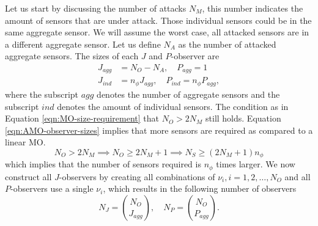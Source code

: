 Let us start by discussing the number of attacks $N_M$, this number indicates the amount of sensors that are under attack. Those individual sensors could be in the same aggregate sensor. We will assume the worst case, all attacked sensors are in a different aggregate sensor. Let us define $N_A$ as the number of attacked aggregate sensors. The sizes of each $J$ and $P$-observer are
\begin{equation}\label{eqn:AMO-observer-sizes}
    \begin{split}
        J_{agg}&=N_O-N_A, \quad P_{agg}=1 \\
        J_{ind} &= n_{\phi}J_{agg}, \quad P_{ind} = n_{\phi}P_{agg},
    \end{split}
\end{equation}
where the subscript $agg$ denotes the number of aggregate sensors and the subscript $ind$ denotes the amount of individual sensors. The condition as in Equation \eqref{eqn:MO-size-requirement} that $N_O>2N_M$ still holds. Equation \eqref{eqn:AMO-observer-sizes} implies that more sensors are required as compared to a linear MO. 
\begin{equation*}
    N_O > 2N_M \implies N_O \geq 2N_M + 1 \implies N_S \geq (2N_M + 1)n_{\phi}
\end{equation*}
which implies that the number of sensors required is $n_{\phi}$ times larger. We now construct all $J$-observers by creating all combinations of $\nu_i,i=1,2,\dots,N_O$ and all $P$-observers use a single $\nu_i$, which results in the following number of observers
\begin{equation*}
    N_J = \binom{N_O}{J_{agg}}, \quad N_P = \binom{N_O}{P_{agg}}.
\end{equation*}


